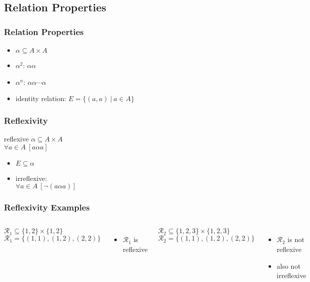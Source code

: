 \documentclass[dvipsnames]{beamer}
\begin{document}
\subsection{Relation Properties}

\begin{frame}
  \frametitle{Relation Properties}

  \begin{itemize}
    \item $\alpha \subseteq A \times A$

    \medskip
    \item $\alpha^2$: $\alpha \alpha$
    \item $\alpha^n$: $\alpha \alpha \cdots \alpha$

    \medskip
    \item \alert{identity relation}: $E = \{(a,a)~|~a \in A\}$
  \end{itemize}
\end{frame}

\begin{frame}
  \frametitle{Reflexivity}

  \begin{block}{reflexive}
    $\alpha \subseteq A \times A$\\
    $\forall a \in A~[a \alpha a]$
  \end{block}

  \pause
  \begin{itemize}
    \item $E \subseteq \alpha$

    \pause
    \item irreflexive:\\
      $\forall a \in A~[\neg (a \alpha a)]$
  \end{itemize}
\end{frame}

\begin{frame}
  \frametitle{Reflexivity Examples}

  \begin{columns}[t]
    $\mathcal{R}_1 \subseteq \{1,2\} \times \{1,2\}$\\
    $\mathcal{R}_1 = \{(1,1), (1,2), (2,2)\}$

    \medskip
    \begin{itemize}
      \item $\mathcal{R}_1$ is reflexive
    \end{itemize}

    \pause
    $\mathcal{R}_2 \subseteq \{1,2,3\} \times \{1,2,3\}$\\
    $\mathcal{R}_2 = \{(1,1), (1,2), (2,2)\}$

    \medskip
    \begin{itemize}
      \item $\mathcal{R}_2$ is not reflexive
      \item also not irreflexive
    \end{itemize}
  \end{columns}
\end{frame}
\end{document}
